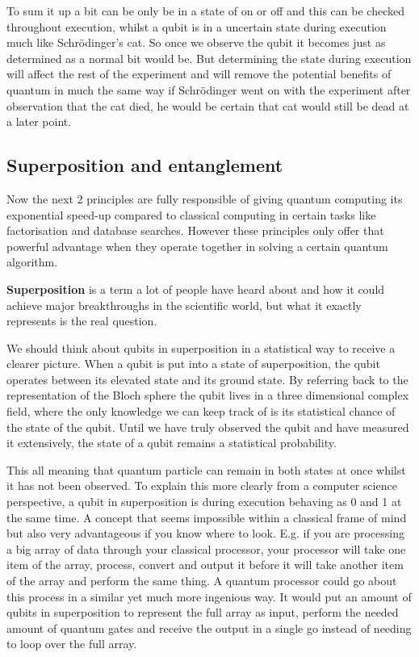 To sum it up a bit can be only be in a state of on or off and this can be checked throughout execution, whilst a qubit is in a uncertain state during execution much like Schrödinger's cat. So once we observe the qubit it becomes just as determined as a normal bit would be. But determining the state during execution will affect the rest of the experiment and will remove the potential benefits of quantum in much the same way if Schrödinger went on with the experiment after observation that the cat died, he would be certain that cat would still be dead at a later point.

\subsection{Superposition and entanglement}

Now the next 2 principles are fully responsible of giving quantum computing its exponential speed-up compared to classical computing in certain tasks like factorisation and database searches. However these principles only offer that powerful advantage when they operate together in solving a certain quantum algorithm. 

\textbf{Superposition} is a term a lot of people have heard about and how it could achieve major breakthroughs in the scientific world, but what it exactly represents is the real question.

We should think about qubits in superposition in a statistical way to receive a clearer picture. When a qubit is put into a state of superposition, the qubit operates between its elevated state and its ground state. By referring back to the representation of the Bloch sphere the qubit lives in a three dimensional complex field, where the only knowledge we can keep track of is its statistical chance of the state of the qubit. Until we have truly observed the qubit and have measured it extensively, the state of a qubit remains a statistical probability.

This all meaning that quantum particle can remain in both states at once whilst it has not been observed. To explain this more clearly from a computer science perspective, a qubit in superposition is during execution behaving as 0 and 1 at the same time. A concept that seems impossible within a classical frame of mind but also very advantageous if you know where to look. E.g. if you are processing a big array of data through your classical processor, your processor will take one item of the array, process, convert and output it before it will take another item of the array and perform the same thing. A quantum processor could go about this process in a similar yet much more ingenious way. It would put an amount of qubits in superposition to represent the full array as input, perform the needed amount of quantum gates and receive the output in a single go instead of needing to loop over the full array. ~\autocite{Draper2000}

